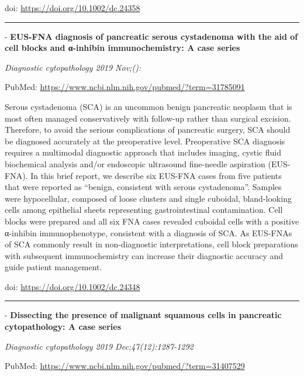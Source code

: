 \documentclass[
]{article}
\renewcommand{\linethickness}{0.05em}
\begin{document}
doi: \url{https://doi.org/10.1002/dc.24358}

\begin{center}\rule{0.5\linewidth}{\linethickness}\end{center}

- \textbf{EUS-FNA diagnosis of pancreatic serous cystadenoma with the
aid of cell blocks and α-inhibin immunochemistry: A case series}

\emph{Diagnostic cytopathology 2019 Nov;():}

PubMed: \url{https://www.ncbi.nlm.nih.gov/pubmed/?term=31785091}

Serous cystadenoma (SCA) is an uncommon benign pancreatic neoplasm that
is most often managed conservatively with follow-up rather than surgical
excision. Therefore, to avoid the serious complications of pancreatic
surgery, SCA should be diagnosed accurately at the preoperative level.
Preoperative SCA diagnosis requires a multimodal diagnostic approach
that includes imaging, cystic fluid biochemical analysis and/or
endoscopic ultrasound fine-needle aspiration (EUS-FNA). In this brief
report, we describe six EUS-FNA cases from five patients that were
reported as ``benign, consistent with serous cystadenoma''. Samples were
hypocellular, composed of loose clusters and single cuboidal,
bland-looking cells among epithelial sheets representing
gastrointestinal contamination. Cell blocks were prepared and all six
FNA cases revealed cuboidal cells with a positive α-inhibin
immunophenotype, consistent with a diagnosis of SCA. As EUS-FNAs of SCA
commonly result in non-diagnostic interpretations, cell block
preparations with subsequent immunochemistry can increase their
diagnostic accuracy and guide patient management.

doi: \url{https://doi.org/10.1002/dc.24348}

\begin{center}\rule{0.5\linewidth}{\linethickness}\end{center}

- \textbf{Dissecting the presence of malignant squamous cells in
pancreatic cytopathology: A case series}

\emph{Diagnostic cytopathology 2019 Dec;47(12):1287-1292}

PubMed: \url{https://www.ncbi.nlm.nih.gov/pubmed/?term=31407529}
\end{document}
